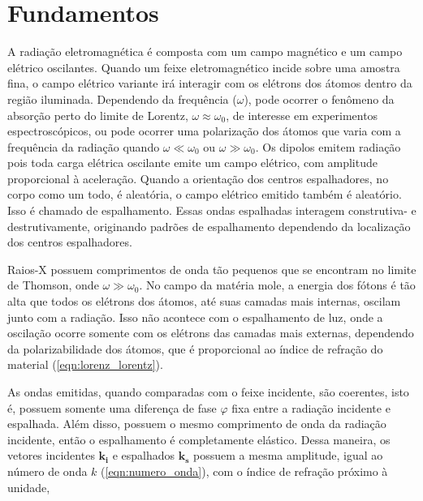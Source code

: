 		\section{Fundamentos} 
		
		
		A radiação eletromagnética é composta com um campo magnético e um campo elétrico oscilantes. Quando um feixe eletromagnético incide sobre uma amostra fina, o campo elétrico variante irá interagir com os elétrons dos átomos dentro da região iluminada. Dependendo da frequência (\(\omega\)), pode ocorrer o fenômeno da absorção perto do limite de Lorentz, \(\omega \approx \omega_0\), de interesse em experimentos espectroscópicos, ou pode ocorrer uma polarização dos átomos que varia com a frequência da radiação quando \(\omega \ll \omega_0\) ou \(\omega \gg \omega_0\). Os dipolos emitem radiação pois toda carga elétrica oscilante emite um campo elétrico, com amplitude proporcional à aceleração. Quando a orientação dos centros espalhadores, no corpo como um todo, é aleatória, o campo elétrico emitido também é aleatório. Isso é chamado de espalhamento. Essas ondas espalhadas interagem construtiva- e destrutivamente, originando padrões de espalhamento dependendo da localização dos centros espalhadores.\cite{Glatter2018livro}
		
		Raios-X possuem comprimentos de onda tão pequenos que se encontram no limite de Thomson, onde \(\omega \gg \omega_0\). No campo da matéria mole, a energia dos fótons é tão alta que todos os elétrons dos átomos, até suas camadas mais internas, oscilam junto com a radiação. Isso não acontece com o espalhamento de luz, onde a oscilação ocorre somente com os elétrons das camadas mais externas, dependendo da polarizabilidade dos átomos, que é proporcional ao índice de refração do material (\autoref{eqn:lorenz_lorentz}).\cite{Glatter2018livro}
		
		As ondas emitidas, quando comparadas com o feixe incidente, são coerentes, isto é, possuem somente uma diferença de fase \(\varphi\) fixa entre a radiação incidente e espalhada. Além disso, possuem o mesmo comprimento de onda da radiação incidente, então o espalhamento é completamente elástico. Dessa maneira, os vetores incidentes \(\mathbf{k_i}\) e espalhados \(\mathbf{k_s}\) possuem a mesma amplitude, igual ao número de onda \(k\) (\autoref{eqn:numero_onda}), com o índice de refração próximo à unidade, 
		
